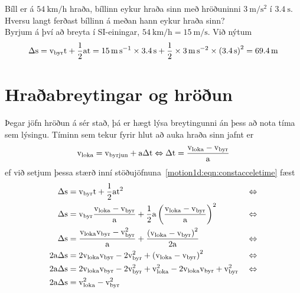 %
\begin{formalexample}
Bíll er á $\SI{54}{\km\per\hour}$ hraða, bíllinn eykur hraða sinn með hröðuninni
$\SI{3}{\m\per\s\squared}$ í $\SI{3.4}{\s}$.  
Hversu langt ferðast bíllinn á meðan hann eykur hraða sinn?
\\[4 ex]
Byrjum á því að breyta í SI-einingar, 
$\SI{54}{\km\per\hour} = \SI{15}{\m\per\s}$.
Við nýtum
\[
	\Delta\ulengths = \uspeed_\text{byr} \utime 
			+ \frac{1}{2} \uaccelea \utime
		= \SI{15}{\m\per\s} \times \SI{3.4}{\s}
			+ \frac{1}{2} \times 
				\SI{3}{\m\per\s\squared}
				\times \left( \SI{3.4}{\s} \right)^2
		= \SI{69.4}{\m}
\]
\end{formalexample}

\section{Hraðabreytingar og hröðun}
Þegar jöfn hröðun á sér stað, þá er hægt lýsa breytingunni án þess að nota
tíma sem lýsingu. Tíminn sem tekur fyrir hlut að auka hraða sinn jafnt er
\[
	\textrm{v}_\text{loka} = \textrm{v}_\text{byrjun} + \textrm{a} \Delta\textrm{t}
		\Leftrightarrow
		\Delta\textrm{t} = \frac{\textrm{v}_\text{loka} - \textrm{v}_\text{byr}}{\textrm{a}}
\]
ef við setjum þessa stærð inní stöðujöfnuna~\ref{motion1d:eqn:constacceletime} 
fæst
\begin{align*}
	\Delta\textrm{s} &= \textrm{v}_\text{byr} \textrm{t} 
		+ \frac{1}{2} \textrm{a} \textrm{t}^2 
		&&\Leftrightarrow \\
	\Delta\textrm{s} &= \textrm{v}_\text{byr} \frac{\textrm{v}_\text{loka} - \textrm{v}_\text{byr}}{\textrm{a}}
		+ \frac{1}{2} \textrm{a} \left(\frac{\textrm{v}_\text{loka} - \textrm{v}_\text{byr}}{\textrm{a}}\right)^2 
		&&\Leftrightarrow \\
	\Delta\textrm{s} &=  \frac{\textrm{v}_\text{loka}\textrm{v}_\text{byr} - \textrm{v}_\text{byr}^2}{\textrm{a}}
		+ \frac{\left(\textrm{v}_\text{loka} - \textrm{v}_\text{byr}\right)^2}{2\textrm{a}} 
		&&\Leftrightarrow \\
	2\textrm{a} \Delta\textrm{s} &=  2\textrm{v}_\text{loka}\textrm{v}_\text{byr} - 2\textrm{v}_\text{byr}^2
		+ \left(\textrm{v}_\text{loka} - \textrm{v}_\text{byr}\right)^2
		&&\Leftrightarrow \\
	2\textrm{a} \Delta\textrm{s} &=  2\textrm{v}_\text{loka}\textrm{v}_\text{byr} - 2\textrm{v}_\text{byr}^2
		+ \textrm{v}_\text{loka}^2 - 2\textrm{v}_\text{loka}\textrm{v}_\text{byr} + \textrm{v}_\text{byr}^2
		&&\Leftrightarrow \\
	2\textrm{a} \Delta\textrm{s} &=  \textrm{v}_\text{loka}^2 - \textrm{v}_\text{byr}^2
\end{align*}
